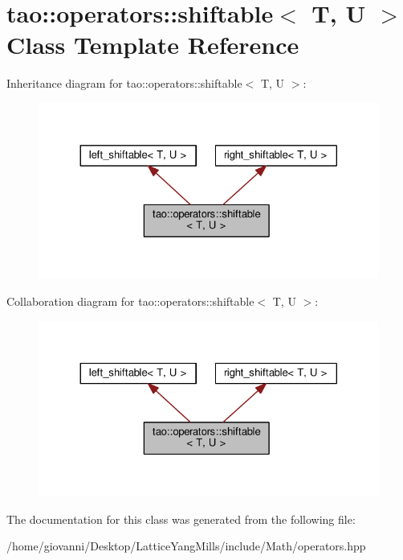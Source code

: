 \hypertarget{classtao_1_1operators_1_1shiftable}{}\section{tao\+:\+:operators\+:\+:shiftable$<$ T, U $>$ Class Template Reference}
\label{classtao_1_1operators_1_1shiftable}


Inheritance diagram for tao\+:\+:operators\+:\+:shiftable$<$ T, U $>$\+:\nopagebreak
\begin{figure}[H]
\begin{center}
\leavevmode
\includegraphics[width=324pt]{classtao_1_1operators_1_1shiftable__inherit__graph}
\end{center}
\end{figure}


Collaboration diagram for tao\+:\+:operators\+:\+:shiftable$<$ T, U $>$\+:\nopagebreak
\begin{figure}[H]
\begin{center}
\leavevmode
\includegraphics[width=324pt]{classtao_1_1operators_1_1shiftable__coll__graph}
\end{center}
\end{figure}


The documentation for this class was generated from the following file\+:\begin{DoxyCompactItemize}
\item 
/home/giovanni/\+Desktop/\+Lattice\+Yang\+Mills/include/\+Math/operators.\+hpp\end{DoxyCompactItemize}
